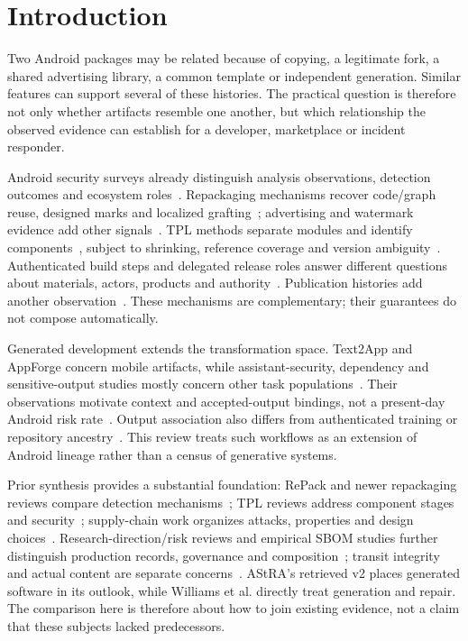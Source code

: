 \section{Introduction}

Two Android packages may be related because of copying, a legitimate fork, a shared advertising library, a common template or independent generation. Similar features can support several of these histories. The practical question is therefore not only whether artifacts resemble one another, but which relationship the observed evidence can establish for a developer, marketplace or incident responder.

Android security surveys already distinguish analysis observations, detection outcomes and ecosystem roles~\cite{xuandroid,tamandroid}. Repackaging mechanisms recover code/graph reuse, designed marks and localized grafting~\cite{droidmoss,attackclones,piggybacking}; advertising and watermark evidence add other signals~\cite{adrob,appink}. TPL methods separate modules and identify components~\cite{commonlibraries,libd,libradar}, subject to shrinking, reference coverage and version ambiguity~\cite{libscout,libid,atvhunter}. Authenticated build steps and delegated release roles answer different questions about materials, actors, products and authority~\cite{intoto,tuf,diplomat}. Publication histories add another observation~\cite{chainiac}. These mechanisms are complementary; their guarantees do not compose automatically.

Generated development extends the transformation space. Text2App and AppForge concern mobile artifacts, while assistant-security, dependency and sensitive-output studies mostly concern other task populations~\cite{text2app,appforge,pearce}. Their observations motivate context and accepted-output bindings, not a present-day Android risk rate~\cite{perry,sandoval,spracklen}. Output association also differs from authenticated training or repository ancestry~\cite{codexleaks}. This review treats such workflows as an extension of Android lineage rather than a census of generative systems.

Prior synthesis provides a substantial foundation: RePack and newer repackaging reviews compare detection mechanisms~\cite{repack,wurepack2026}; TPL reviews address component stages and security~\cite{tpl,zengtpsurvey2024}; supply-chain work organizes attacks, properties and design choices~\cite{astra,properties,ladisa}. Research-direction/risk reviews and empirical SBOM studies further distinguish production records, governance and composition~\cite{williams2025,cyberrisk2026,bi2024sbom}; transit integrity and actual content are separate concerns~\cite{bomsaway2024}. AStRA's retrieved v2 places generated software in its outlook, while Williams et al. directly treat generation and repair. The comparison here is therefore about how to join existing evidence, not a claim that these subjects lacked predecessors.

